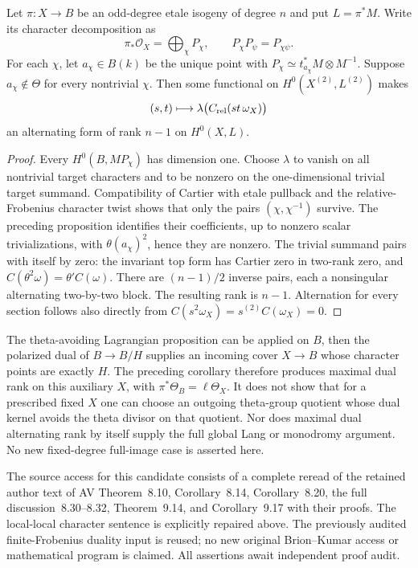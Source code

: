 \begin{corollary}
\label{cor:principal-theta-odd-cover-dual-rank}
Let \(\pi:X\to B\) be an odd-degree etale isogeny of degree \(n\)
and put \(L=\pi^*M\).  Write its character decomposition as
\[
 \pi_*\mathcal O_X=\bigoplus_\chi P_\chi,
 \qquad P_\chi P_\psi=P_{\chi\psi}.
\]
For each \(\chi\), let \(a_\chi\in B(k)\) be the unique point
with \(P_\chi\simeq t_{a_\chi}^*M\otimes M^{-1}\).
Suppose \(a_\chi\notin\Theta\) for every nontrivial \(\chi\).
Then some functional on \(H^0(X^{(2)},L^{(2)})\) makes
\[
 (s,t)\longmapsto\lambda\bigl(C_{\rm rel}(st\,\omega_X)\bigr)
\]
an alternating form of rank \(n-1\) on \(H^0(X,L)\).
\end{corollary}
\begin{proof}
Every \(H^0(B,MP_\chi)\) has dimension one.  Choose \(\lambda\)
to vanish on all nontrivial target characters and to be nonzero on the
one-dimensional trivial target summand.  Compatibility of Cartier with
etale pullback and the relative-Frobenius character twist shows that
only the pairs \((\chi,\chi^{-1})\) survive.  The preceding
proposition identifies their coefficients, up to nonzero scalar
trivializations, with \(\theta(a_\chi)^2\), hence they are nonzero.
The trivial summand pairs with itself by zero: the invariant top form
has Cartier zero in two-rank zero, and
\(C(\theta^2\omega)=\theta' C(\omega)\).
There are \((n-1)/2\) inverse pairs, each a nonsingular alternating
two-by-two block.  The resulting rank is \(n-1\).  Alternation for
every section follows also directly from
\(C(s^2\omega_X)=s^{(2)}C(\omega_X)=0\).
\end{proof}

\begin{remark}
\label{rem:principal-theta-Cartier-bridge-scope}
The theta-avoiding Lagrangian proposition can be applied on \(B\),
then the polarized dual of \(B\to B/H\) supplies an incoming cover
\(X\to B\) whose character points are exactly \(H\).  The preceding
corollary therefore produces maximal dual rank on this auxiliary
\(X\), with \(\pi^*\Theta_B=\ell\Theta_X\).  It does not show that
for a prescribed fixed \(X\) one can choose an outgoing theta-group
quotient whose dual kernel avoids the theta divisor on that quotient.
Nor does maximal dual alternating rank by itself supply the full
global Lang or monodromy argument.  No new fixed-degree full-image
case is asserted here.

The source access for this candidate consists of a complete reread of
the retained author text of AV Theorem~8.10, Corollary~8.14,
Corollary~8.20, the full discussion~8.30--8.32, Theorem~9.14, and
Corollary~9.17 with their proofs.  The local-local character sentence
is explicitly repaired above.  The previously audited finite-Frobenius
duality input is reused; no new original Brion--Kumar access or
mathematical program is claimed.  All assertions await independent
proof audit.
\end{remark}
